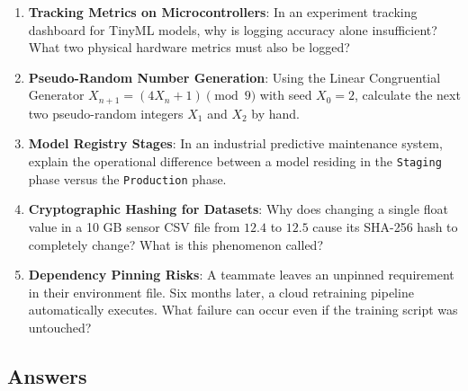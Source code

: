 \begin{enumerate}
    \item \textbf{Tracking Metrics on Microcontrollers}: In an experiment tracking dashboard for TinyML models, why is logging accuracy alone insufficient? What two physical hardware metrics must also be logged?

    \item \textbf{Pseudo-Random Number Generation}: Using the Linear Congruential Generator $X_{n+1} = (4 X_n + 1) \pmod 9$ with seed $X_0 = 2$, calculate the next two pseudo-random integers $X_1$ and $X_2$ by hand.

    \item \textbf{Model Registry Stages}: In an industrial predictive maintenance system, explain the operational difference between a model residing in the \texttt{Staging} phase versus the \texttt{Production} phase.

    \item \textbf{Cryptographic Hashing for Datasets}: Why does changing a single float value in a 10 GB sensor CSV file from $12.4$ to $12.5$ cause its SHA-256 hash to completely change? What is this phenomenon called?

    \item \textbf{Dependency Pinning Risks}: A teammate leaves an unpinned requirement  in their environment file. Six months later, a cloud retraining pipeline automatically executes. What failure can occur even if the training script was untouched?
\end{enumerate}

\subsection*{Answers}

